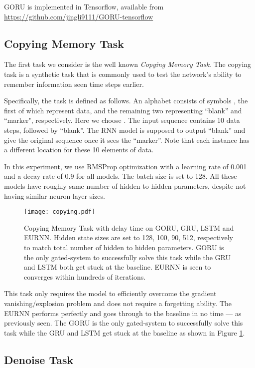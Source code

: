 \documentclass[letterpaper]{article} \usepackage{aaai18}  \usepackage{times}  \usepackage{helvet}  \usepackage{courier}  \usepackage{url}  \usepackage{graphicx}
\begin{document}
GORU is implemented in Tensorflow, available from \url{https://github.com/jingli9111/GORU-tensorflow} 

\subsection{Copying Memory Task}

The first task we consider is the well known {\it Copying Memory Task}. The copying task is a synthetic task that is commonly used to test the network's ability to remember information seen  time steps earlier. 

Specifically, the task is defined as follows.
An alphabet consists of symbols  , the first  of which represent data, and the remaining two representing ``blank'' and ``marker", respectively. Here we choose .
The input sequence contains 10 data steps, followed by ``blank''. The RNN model is supposed to output ``blank'' and give the original sequence once it sees the ``marker''. Note that each instance has a different location for these 10 elements of data.

In this experiment, we use RMSProp optimization with a learning rate of 0.001 and a decay rate of 0.9 for all models. The batch size is set to 128. All these models have roughly same number of hidden to hidden parameters, despite not having similar neuron layer sizes.
\begin{figure}[h!]
\centering
\texttt{[image: copying.pdf]}
\caption{Copying Memory Task with delay time  on GORU, GRU, LSTM and EURNN. Hidden state sizes are set to 128, 100, 90, 512, respectively to match total number of hidden to hidden parameters. GORU is the only gated-system to successfully solve this task while the GRU and LSTM both get stuck at the baseline. EURNN is seen to converges within hundreds of iterations. }
\label{fig:copying}
\end{figure}

This task only requires the model to efficiently overcome the gradient vanishing/explosion problem and does not require a forgetting ability. The EURNN performs perfectly and goes through to the baseline in no time --- as previously seen.
The GORU is the only gated-system to successfully solve this task while the GRU and LSTM get stuck at the baseline as shown in Figure \ref{fig:copying}.


\subsection{Denoise Task}
\end{document}
